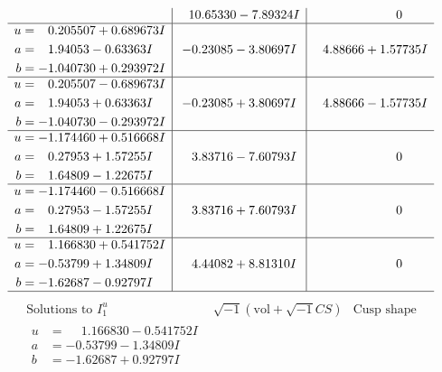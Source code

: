 \documentclass[1p]{elsarticle_modified}
\theoremstyle{definition}
\newcommand{\I}{\sqrt{-1}}
\begin{document}
$$\begin{array}{c|c|c}
 & \phantom{-}10.65330 - 7.89324 I & \phantom{-0.000000 } 0 \\ \hline\begin{aligned}
u &= \phantom{-}0.205507 + 0.689673 I \\
a &= \phantom{-}1.94053 - 0.63363 I \\
b &= -1.040730 + 0.293972 I\end{aligned}
 & -0.23085 - 3.80697 I & \phantom{-}4.88666 + 1.57735 I \\ \hline\begin{aligned}
u &= \phantom{-}0.205507 - 0.689673 I \\
a &= \phantom{-}1.94053 + 0.63363 I \\
b &= -1.040730 - 0.293972 I\end{aligned}
 & -0.23085 + 3.80697 I & \phantom{-}4.88666 - 1.57735 I \\ \hline\begin{aligned}
u &= -1.174460 + 0.516668 I \\
a &= \phantom{-}0.27953 + 1.57255 I \\
b &= \phantom{-}1.64809 - 1.22675 I\end{aligned}
 & \phantom{-}3.83716 - 7.60793 I & \phantom{-0.000000 } 0 \\ \hline\begin{aligned}
u &= -1.174460 - 0.516668 I \\
a &= \phantom{-}0.27953 - 1.57255 I \\
b &= \phantom{-}1.64809 + 1.22675 I\end{aligned}
 & \phantom{-}3.83716 + 7.60793 I & \phantom{-0.000000 } 0 \\ \hline\begin{aligned}
u &= \phantom{-}1.166830 + 0.541752 I \\
a &= -0.53799 + 1.34809 I \\
b &= -1.62687 - 0.92797 I\end{aligned}
 & \phantom{-}4.44082 + 8.81310 I & \phantom{-0.000000 } 0\\
 \hline 
 \end{array}$$\newpage$$\begin{array}{c|c|c}  
\text{Solutions to }I^u_{1}& \I (\text{vol} + \sqrt{-1}CS) & \text{Cusp shape}\\
 \hline 
\begin{aligned}
u &= \phantom{-}1.166830 - 0.541752 I \\
a &= -0.53799 - 1.34809 I \\
b &= -1.62687 + 0.92797 I\end{aligned}

\end{array}$$
\end{document}

